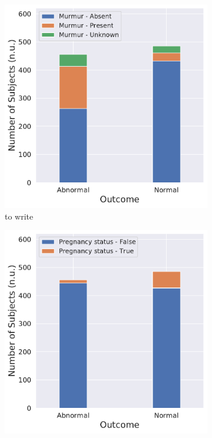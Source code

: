 \begin{figure}[!htp]
\centering
\begin{subfigure}[b]{0.49\linewidth}
    \centering
    \includegraphics[width=\textwidth]{images/outcome_murmur_corr.pdf}
    \caption[]%
    {{\small to write}}    
    \label{fig:outcome_murmur_corr}
\end{subfigure}
\hfill
\begin{subfigure}[b]{0.49\linewidth}  
    \centering 
    \includegraphics[width=\textwidth]{images/outcome_pregnancy_status_corr.pdf}

\end{subfigure}
\end{figure}
